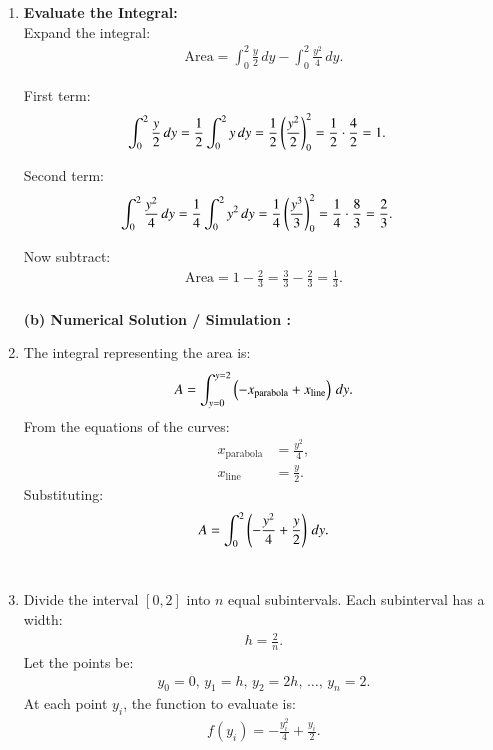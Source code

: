 \documentclass[journal]{IEEEtran}
\begin{document}
\begin{enumerate}
    \item \textbf{Evaluate the Integral:}  \\
    Expand the integral:
    \begin{align}
        \text{Area} = \int_{0}^{2} \frac{y}{2} \, dy - \int_{0}^{2} \frac{y^2}{4} \, dy.
    \end{align}

    First term:
    \begin{align}
        \int_{0}^{2} \frac{y}{2} \, dy &= \frac{1}{2} \int_{0}^{2} y \, dy = \frac{1}{2} \left( \frac{y^2}{2} \right)_{0}^{2} = \frac{1}{2} \cdot \frac{4}{2} = 1.
    \end{align}

    Second term:
    \begin{align}
        \int_{0}^{2} \frac{y^2}{4} \, dy &= \frac{1}{4} \int_{0}^{2} y^2 \, dy = \frac{1}{4} \left( \frac{y^3}{3} \right)_{0}^{2} = \frac{1}{4} \cdot \frac{8}{3} = \frac{2}{3}.
    \end{align}

    Now subtract:
    \begin{align}
        \text{Area} = 1 - \frac{2}{3} = \frac{3}{3} - \frac{2}{3} = \frac{1}{3}.
    \end{align} \\
    
\textbf{(b) Numerical Solution / Simulation : } \\
\item The integral representing the area is:
    \begin{align}
    A = \int_{y=0}^{y=2} \left(-x_{\text{parabola}} + x_{\text{line}}\right) \, dy.
    \end{align}
    From the equations of the curves:
    \begin{align}
    x_{\text{parabola}} &= \frac{y^2}{4}, \\
    x_{\text{line}} &= \frac{y}{2}.
    \end{align}
    Substituting:
    \begin{align}
    A = \int_{0}^{2} \left(-\frac{y^2}{4} + \frac{y}{2}\right) \, dy.
    \end{align} \\

    \item Divide the interval $[0, 2]$ into $n$ equal subintervals. Each subinterval has a width:
    \begin{align}
    h = \frac{2}{n}.
    \end{align}
    Let the points be:
    \begin{align}
    y_0 = 0, \, y_1 = h, \, y_2 = 2h, \, \dots, \, y_n = 2.
    \end{align}
    At each point $y_i$, the function to evaluate is:
    \begin{align}
    f(y_i) = -\frac{y_i^2}{4} + \frac{y_i}{2}.
    \end{align} \\


\end{enumerate}
\end{document}
